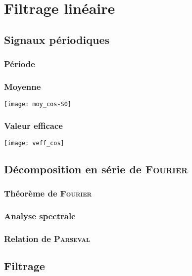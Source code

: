 \documentclass[../main/main.tex]{subfiles}
\begin{document}
\setcounter{chapter}{6}

\chapter{Filtrage lin\'eaire}

\section{Signaux périodiques}
\subsection{Période}

\subsection{Moyenne}
\begin{center}
    \texttt{[image: moy\_cos-S0]}
\end{center}

\subsection{Valeur efficace}
\begin{center}
    \texttt{[image: veff\_cos]}
\end{center}

\section{Décomposition en série de \textsc{Fourier}}

\subsection{Théorème de \textsc{Fourier}}

\subsection{Analyse spectrale}

\subsection{Relation de \textsc{Parseval}}

\section{Filtrage}
\end{document}
